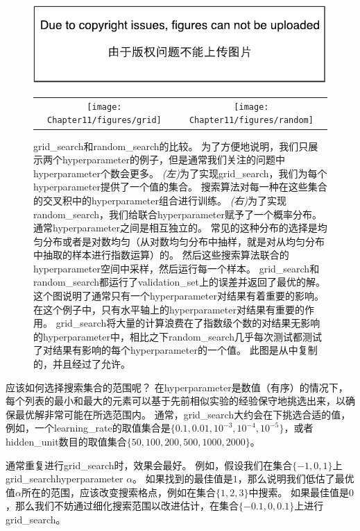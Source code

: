 \begin{figure}[!htb]
\ifOpenSource
\centerline{\includegraphics{figure.pdf}}
\else
\begin{tabular}{cc}
\texttt{[image: Chapter11/figures/grid]} &
\texttt{[image: Chapter11/figures/random]}
\end{tabular}
\fi
\caption{\gls{grid_search}和\gls{random_search}的比较。
为了方便地说明，我们只展示两个\gls{hyperparameter}的例子，但是通常我们关注的问题中\gls{hyperparameter}个数会更多。
\emph{(左)}为了实现\gls{grid_search}，我们为每个\gls{hyperparameter}提供了一个值的集合。
搜索算法对每一种在这些集合的交叉积中的\gls{hyperparameter}组合进行训练。
\emph{(右)}为了实现\gls{random_search}，我们给联合\gls{hyperparameter}赋予了一个概率分布。
通常\gls{hyperparameter}之间是相互独立的。
常见的这种分布的选择是均匀分布或者是对数均匀（从对数均匀分布中抽样，就是对从均匀分布中抽取的样本进行指数运算）的。
然后这些搜索算法联合的\gls{hyperparameter}空间中采样，然后运行每一个样本。
\gls{grid_search}和\gls{random_search}都运行了\gls{validation_set}上的误差并返回了最优的解。
这个图说明了通常只有一个\gls{hyperparameter}对结果有着重要的影响。
在这个例子中，只有水平轴上的\gls{hyperparameter}对结果有重要的作用。
\gls{grid_search}将大量的计算浪费在了指数级个数的对结果无影响的\gls{hyperparameter}中，相比之下\gls{random_search}几乎每次测试都测试了对结果有影响的每个\gls{hyperparameter}的一个值。
此图是从\citet{Bergstra+Bengio-LW2011}中复制的，并且经过了允许。}
\label{fig:chap11_grid_vs_random}
\end{figure}


应该如何选择搜索集合的范围呢？
在\gls{hyperparameter}是数值（有序）的情况下，每个列表的最小和最大的元素可以基于先前相似实验的经验保守地挑选出来，以确保最优解非常可能在所选范围内。
通常，\gls{grid_search}大约会在下挑选合适的值，例如，一个\gls{learning_rate}的取值集合是$\{0.1,0.01,10^{-3},10^{-4},10^{-5}\}$，或者\gls{hidden_unit}数目的取值集合$\{50,100,200,500,1000,2000\}$。


通常重复进行\gls{grid_search}时，效果会最好。
例如，假设我们在集合$\{-1,0,1\}$上\gls{grid_search}\gls{hyperparameter} $\alpha$。
如果找到的最佳值是$1$，那么说明我们低估了最优值$\alpha$所在的范围，应该改变搜索格点，例如在集合$\{1,2,3\}$中搜索。
如果最佳值是$0$，那么我们不妨通过细化搜索范围以改进估计，在集合$\{-0.1,0,0.1\}$上进行\gls{grid_search}。


